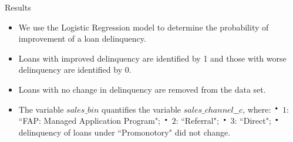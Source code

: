 \documentclass{beamer}
\newcommand*{\LargerCdot}{\raisebox{-0.25ex}{\scalebox{2.3}{$\cdot$}}}
\begin{document}
\begin{frame}{Results}{}
	\begin{itemize}
		\vspace{-0.1 in}		
		\item{We use the {\color{blue}Logistic Regression} model to determine the probability of improvement of a loan delinquency.} \newline\vspace{0 in}
		\item{Loans with improved delinquency are identified by 1 and those with worse delinquency are identified by 0.} \newline\vspace{0 in}
		\item{Loans with no change in delinquency are removed from the data set.} \newline\vspace{0 in}
		\item{The variable $sales\_bin$ quantifies the variable $sales\_channel\_\_c$, where:} \newline\vspace{0 in}
		{\hspace{-0.06in}}{$\LargerCdot$ $1$: ``FAP: Managed Application Program";}\newline 
		{$\LargerCdot$ $2$: ``Referral";}\newline 
		{$\LargerCdot$ $3$: ``Direct";}\newline
		{$\LargerCdot$ delinquency of loans under ``Promonotory" did not change.}
		\vspace{-0.in}
	\end{itemize}
\end{frame}
\end{document}
